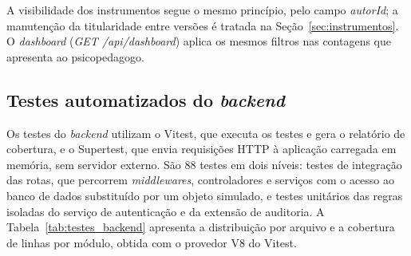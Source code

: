 A visibilidade dos instrumentos segue o mesmo princípio, pelo campo \textit{autorId}; a manutenção da titularidade entre versões é tratada na Seção~\ref{sec:instrumentos}. O \textit{dashboard} (\textit{GET /api/dashboard}) aplica os mesmos filtros nas contagens que apresenta ao psicopedagogo.

\subsection{Testes automatizados do \textit{backend}}

Os testes do \textit{backend} utilizam o Vitest, que executa os testes e gera o relatório de cobertura, e o Supertest, que envia requisições HTTP à aplicação carregada em memória, sem servidor externo. São 88 testes em dois níveis: testes de integração das rotas, que percorrem \textit{middlewares}, controladores e serviços com o acesso ao banco de dados substituído por um objeto simulado, e testes unitários das regras isoladas do serviço de autenticação e da extensão de auditoria. A Tabela~\ref{tab:testes_backend} apresenta a distribuição por arquivo e a cobertura de linhas por módulo, obtida com o provedor V8 do Vitest.


